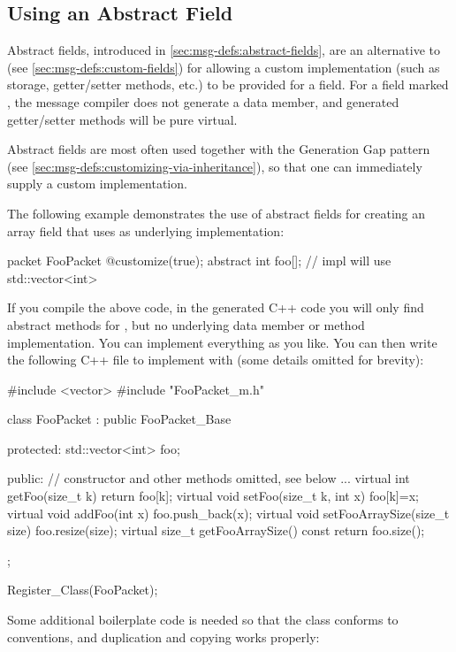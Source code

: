 \subsection{Using an Abstract Field}
\label{sec:msg-defs:customizing-via-abstact-field}

Abstract fields, introduced in \ref{sec:msg-defs:abstract-fields}, are an
alternative to  (see \ref{sec:msg-defs:custom-fields}) for
allowing a custom implementation (such as storage, getter/setter methods, etc.)
to be provided for a field. For a field marked , the message compiler does
not generate a data member, and generated getter/setter methods will be pure
virtual.

Abstract fields are most often used together with the Generation Gap pattern
(see \ref{sec:msg-defs:customizing-via-inheritance}), so that one can
immediately supply a custom implementation.

The following example demonstrates the use of abstract fields for creating
an array field that uses  as underlying implementation:

\begin{msg}
packet FooPacket
{
    @customize(true);
    abstract int foo[]; // impl will use std::vector<int>
}
\end{msg}

If you compile the above code, in the generated C++ code you will only find
abstract methods for , but no underlying data member or method
implementation. You can implement everything as you like. You can then write the
following C++ file to implement  with  (some
details omitted for brevity):

\begin{cpp}
#include <vector>
#include "FooPacket_m.h"

class FooPacket : public FooPacket_Base
{
  protected:
    std::vector<int> foo;

  public:
    // constructor and other methods omitted, see below
    ...
    virtual int getFoo(size_t k) {return foo[k];}
    virtual void setFoo(size_t k, int x) {foo[k]=x;}
    virtual void addFoo(int x) {foo.push_back(x);}
    virtual void setFooArraySize(size_t size) {foo.resize(size);}
    virtual size_t getFooArraySize() const {return foo.size();}
};

Register_Class(FooPacket);
\end{cpp}

Some additional boilerplate code is needed so that the class conforms
to conventions, and duplication and copying works properly:

